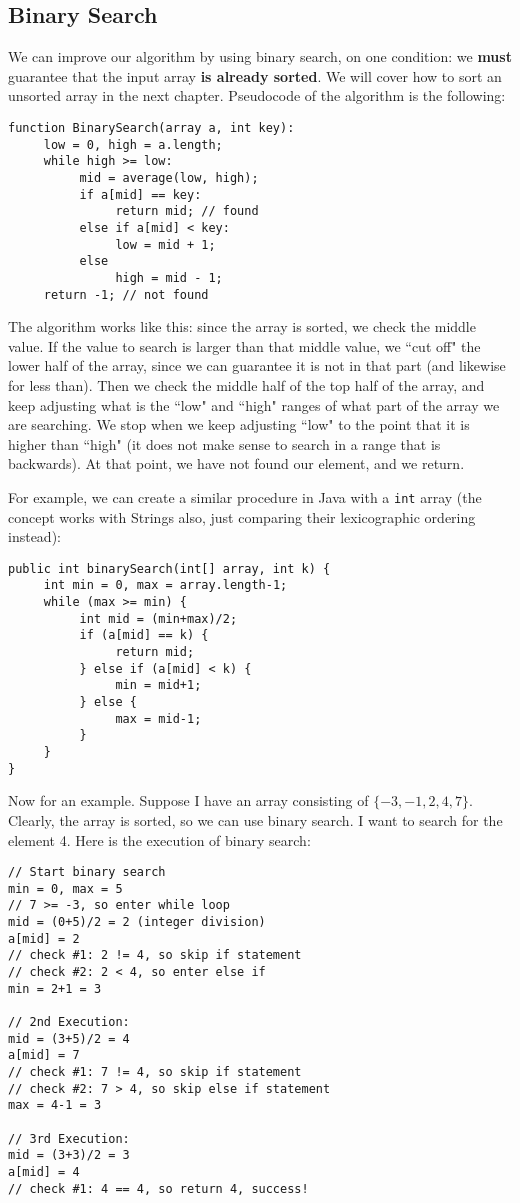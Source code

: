 \subsection{Binary Search}
We can improve our algorithm by using binary search, on one condition: we \textbf{must} guarantee that the input array \textbf{is already sorted}. We will cover how to sort an unsorted array in the next chapter. Pseudocode of the algorithm is the following:
\begin{verbatim}
function BinarySearch(array a, int key):
     low = 0, high = a.length;
     while high >= low:
          mid = average(low, high);
          if a[mid] == key:
               return mid; // found
          else if a[mid] < key:
               low = mid + 1;
          else
               high = mid - 1;
     return -1; // not found
\end{verbatim}
The algorithm works like this: since the array is sorted, we check the middle value. If the value to search is larger than that middle value, we ``cut off" the lower half of the array, since we can guarantee it is not in that part (and likewise for less than). Then we check the middle half of the top half of the array, and keep adjusting what is the ``low" and ``high" ranges of what part of the array we are searching. We stop when we keep adjusting ``low" to the point that it is higher than ``high" (it does not make sense to search in a range that is backwards). At that point, we have not found our element, and we return.

\par For example, we can create a similar procedure in Java with a \verb|int| array (the concept works with Strings also, just comparing their lexicographic ordering instead):
\begin{lstlisting}
public int binarySearch(int[] array, int k) {
     int min = 0, max = array.length-1;
     while (max >= min) {
          int mid = (min+max)/2;
          if (a[mid] == k) {
               return mid;
          } else if (a[mid] < k) {
               min = mid+1;
          } else {
               max = mid-1;
          }
     }
}
\end{lstlisting}
Now for an example. Suppose I have an array consisting of $\{-3, -1, 2, 4, 7\}$. Clearly, the array is sorted, so we can use binary search. I want to search for the element 4. Here is the execution of binary search:
\begin{verbatim}
// Start binary search
min = 0, max = 5
// 7 >= -3, so enter while loop
mid = (0+5)/2 = 2 (integer division)
a[mid] = 2
// check #1: 2 != 4, so skip if statement
// check #2: 2 < 4, so enter else if
min = 2+1 = 3

// 2nd Execution:
mid = (3+5)/2 = 4
a[mid] = 7
// check #1: 7 != 4, so skip if statement
// check #2: 7 > 4, so skip else if statement
max = 4-1 = 3

// 3rd Execution:
mid = (3+3)/2 = 3
a[mid] = 4
// check #1: 4 == 4, so return 4, success!
\end{verbatim}
